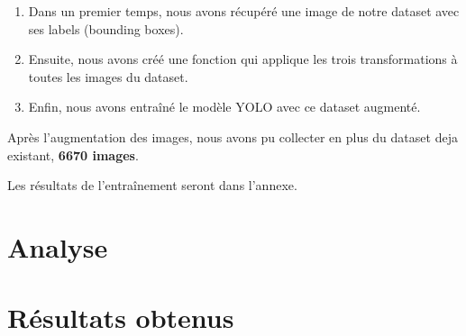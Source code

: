 \begin{enumerate}
	\item Dans un premier temps, nous avons récupéré une image de notre dataset avec ses labels (bounding boxes).
	\item Ensuite, nous avons créé une fonction qui applique les trois transformations à toutes les images du dataset.
	\item Enfin, nous avons entraîné le modèle YOLO avec ce dataset augmenté.
\end{enumerate}

Après l'augmentation des images, nous avons pu collecter en plus du dataset deja existant, \textbf{6670 images}.

Les résultats de l'entraînement seront dans l'annexe.

\section{Analyse}

\section{Résultats obtenus}



